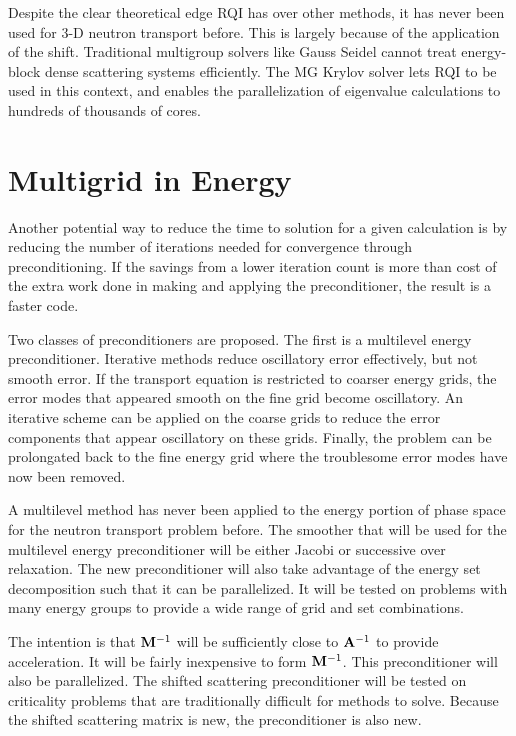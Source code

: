 Despite the clear theoretical edge RQI has over other methods, it has never been used for 3-D neutron transport before. This is largely because of the application of the shift. Traditional multigroup solvers like Gauss Seidel cannot treat energy-block dense scattering systems efficiently. The MG Krylov solver lets RQI to be used in this context, and enables the parallelization of eigenvalue calculations to hundreds of thousands of cores. 

\section{Multigrid in Energy}

Another potential way to reduce the time to solution for a given calculation is by reducing the number of iterations needed for convergence through preconditioning. If the savings from a lower iteration count is more than cost of the extra work done in making and applying the preconditioner, the result is a faster code. 

Two classes of preconditioners are proposed. The first is a multilevel energy preconditioner. Iterative methods reduce oscillatory error effectively, but not smooth error. If the transport equation is restricted to coarser energy grids, the error modes that appeared smooth on the fine grid become oscillatory. An iterative scheme can be applied on the coarse grids to reduce the error components that appear oscillatory on these grids. Finally, the problem can be prolongated back to the fine energy grid where the troublesome error modes have now been removed. 

A multilevel method has never been applied to the energy portion of phase space for the neutron transport problem before. The smoother that will be used for the multilevel energy preconditioner will be either Jacobi or successive over relaxation. The new preconditioner will also take advantage of the energy set decomposition such that it can be parallelized. It will be tested on problems with many energy groups to provide a wide range of grid and set combinations. 

The intention is that $\mathbf{M}^{-1}$ will be sufficiently close to $\mathbf{A}^{-1}$ to provide acceleration. It will be fairly inexpensive to form $\mathbf{M}^{-1}$. This preconditioner will also be parallelized. The shifted scattering preconditioner will be tested on criticality problems that are traditionally difficult for \Sn methods to solve. Because the shifted scattering matrix is new, the preconditioner is also  new.

